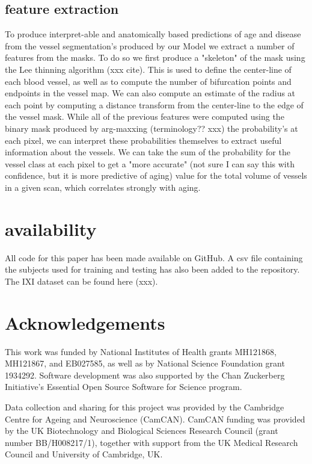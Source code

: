 \documentclass[pdflatex,sn-mathphys-num]{sn-jnl}
\begin{document}
\subsection{feature extraction}

To produce interpret-able and anatomically based predictions of age and disease from the vessel segmentation's produced by our Model we extract a number of features from the masks. To do so we first produce a "skeleton" of the mask using the Lee thinning algorithm (xxx cite). This is used to define the center-line of each blood vessel, as well as to compute the number of bifurcation points and endpoints in the vessel map. We can also compute an estimate of the radius at each point by computing a distance transform from the center-line to the edge of the vessel mask. While all of the previous features were computed using the binary mask produced by arg-maxxing (terminology?? xxx) the probability's at each pixel, we can interpret these probabilities themselves to extract useful information about the vessels. We can take the sum of the probability for the vessel class at each pixel to get a "more accurate" (not sure I can say this with confidence, but it is more predictive of aging) value for the total volume of vessels in a given scan, which correlates strongly with aging.


\section{availability}

All code for this paper has been made available on GitHub. A csv file containing the subjects used for training and testing has also been added to the repository. The IXI dataset can be found here (xxx).


\section{Acknowledgements}

This work was funded by National Institutes of Health grants MH121868, MH121867, and EB027585, as well as by National Science Foundation grant 1934292. Software development was also supported by the Chan Zuckerberg Initiative's Essential Open Source Software for Science program.

Data collection and sharing for this project was provided by the Cambridge Centre for Ageing and Neuroscience (CamCAN). CamCAN funding was provided by the UK Biotechnology and Biological Sciences Research Council (grant number BB/H008217/1), together with support from the UK Medical Research Council and University of Cambridge, UK.


\end{document}
